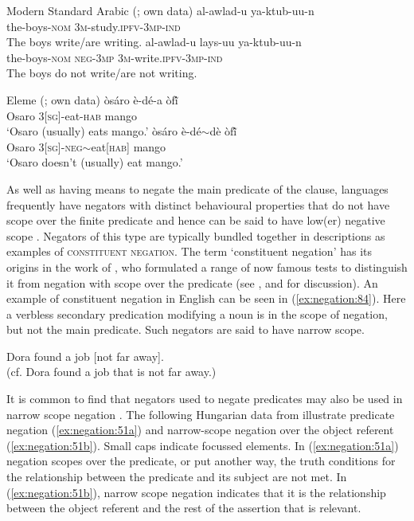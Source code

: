 \documentclass[output=paper,hidelinks]{langscibook}
\begin{document}
\ea Modern Standard Arabic (\citealt [23]{AlsharifSadler:09}; own data)
\label{ex:negation:302}
\ea
\gll al-awlad-u  ya-ktub-uu-n \\
the-boys-\textsc{nom} \textsc{3m}-study.\textsc{ipfv-3mp-ind}\\ 
 \glt The boys write/are writing.
\ex
\gll al-awlad-u lays-uu ya-ktub-uu-n \\
 the-boys-\textsc{nom} \textsc{neg-3mp} \textsc{3m}-write.\textsc{ipfv-3mp-ind}\\
 \glt The boys do not write/are not writing.
\z\z

\ea Eleme (\citealt [283]{Bond2016}; own data)
\label{ex:negation:303}
\ea
\gll òsáro è-dé-a òfĩ́\\
Osaro 3\textsc{[sg]}-eat-\textsc{hab} mango\\
\glt`Osaro (usually) eats mango.’
\ex
\gll òsáro è-dé$\sim$dè òfĩ́\\
Osaro 3\textsc{[sg]-neg}$\sim$eat\textsc{[hab]} mango\\
\glt`Osaro doesn’t (usually) eat mango.’
\z\z

As well as having means to negate the main predicate of the clause, languages frequently have negators with distinct behavioural properties that do not have scope over the finite predicate and hence can be said to have low(er) negative scope \citep{DeClercq:20}. Negators of this type are typically bundled together in descriptions as examples of \textsc{constituent negation}. The term `constituent negation' has its origins in the work of \citet{Klima:64}, who formulated a range of now famous tests to distinguish it from negation with scope over the predicate (see \cite{Payne:85.1}, \cite{deHaan:97} and \cite{DeClercq:20} for discussion). An example of constituent negation in English can be seen in (\ref{ex:negation:84}). Here a verbless secondary predication modifying a noun is in the scope of negation, but not the main predicate. Such negators are said to have narrow scope. 

\ea\label{ex:negation:84}
Dora found a job [not far away].\\
(cf. Dora found a job that is not far away.)\\
\z

It is common to find that negators used to negate predicates may also be used in narrow scope negation \citep{DeClercq:20}. The following Hungarian data from \citet [306--7] {Laczko14} illustrate predicate negation (\ref{ex:negation:51a}) and narrow-scope negation over the object referent (\ref{ex:negation:51b}). Small caps indicate focussed elements. In (\ref{ex:negation:51a}) negation scopes over the predicate, or put another way, the truth conditions for the relationship between the predicate and its subject are not met. In (\ref{ex:negation:51b}), narrow scope negation indicates that it is the relationship between the object referent and the rest of the assertion that is relevant.
\end{document}
